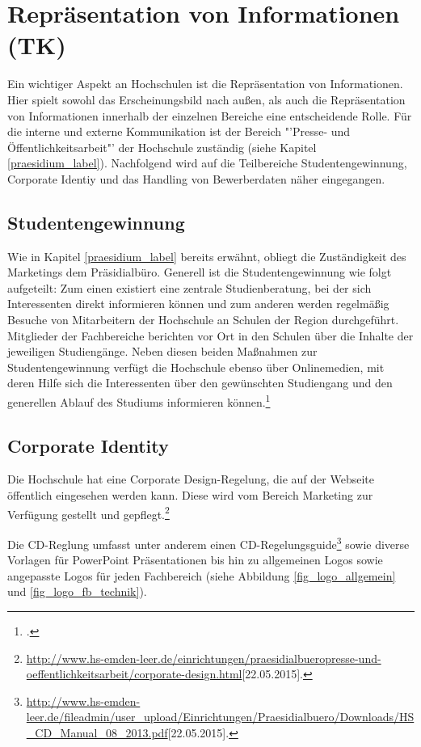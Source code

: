 \section{Repräsentation von Informationen (TK)}
Ein wichtiger Aspekt an Hochschulen ist die Repräsentation von Informationen. Hier spielt sowohl das 
Erscheinungsbild nach außen, als auch die Repräsentation von Informationen innerhalb der einzelnen Bereiche 
eine entscheidende Rolle. Für die interne und externe Kommunikation ist der Bereich "'Presse- und 
Öffentlichkeitsarbeit"' der Hochschule zuständig (siehe Kapitel \ref{praesidium_label}). Nachfolgend wird auf 
die Teilbereiche Studentengewinnung, Corporate Identiy und das Handling von Bewerberdaten näher 
eingegangen.

\subsection{Studentengewinnung}
Wie in Kapitel \ref{praesidium_label} bereits erwähnt, obliegt die Zuständigkeit des Marketings dem 
Präsidialbüro. Generell ist die Studentengewinnung wie folgt aufgeteilt: Zum einen existiert eine zentrale 
Studienberatung, bei der sich Interessenten direkt informieren können und zum anderen werden regelmäßig 
Besuche von Mitarbeitern der Hochschule an Schulen der Region durchgeführt. Mitglieder der Fachbereiche 
berichten vor Ort in den Schulen über die Inhalte der jeweiligen Studiengänge. Neben diesen beiden 
Maßnahmen zur Studentengewinnung verfügt die Hochschule ebenso über Onlinemedien, mit deren Hilfe sich 
die Interessenten über den gewünschten Studiengang und den generellen Ablauf des  Studiums informieren 
können.\footcite{gunter_muller_interview}


\subsection{Corporate Identity}
Die Hochschule hat eine Corporate Design-Regelung, die auf der Webseite öffentlich eingesehen werden 
kann. Diese wird vom Bereich Marketing zur Verfügung gestellt und 
gepflegt.\footnote{\url{http://www.hs-emden-leer.de/einrichtungen/praesidialbueropresse-und-oeffentlichkeitsarbeit/corporate-design.html}[22.05.2015].}

Die CD-Reglung umfasst unter anderem einen 
CD-Regelungsguide\footnote{\url{http://www.hs-emden-leer.de/fileadmin/user_upload/Einrichtungen/Praesidialbuero/Downloads/HS_CD_Manual_08_2013.pdf}[22.05.2015].} sowie diverse Vorlagen für PowerPoint 
Präsentationen bis hin zu allgemeinen Logos sowie angepasste Logos für jeden Fachbereich (siehe Abbildung 
\ref{fig_logo_allgemein} und \ref{fig_logo_fb_technik}).

